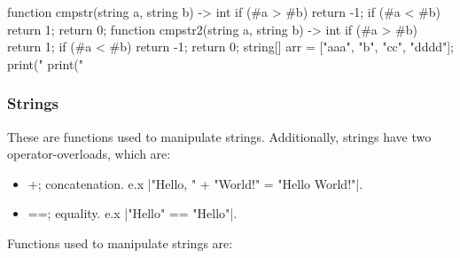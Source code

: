 \documentclass[12pt, letterpaper, oneside]{article}
\begin{document}
\begin{itemize}
		
		\begin{spverbatim}
			function cmpstr(string a, string b) -> int {
				if (#a > #b) {return -1;}
				if (#a < #b) {return 1;}
				return 0;
			}
			function cmpstr2(string a, string b) -> int {
				if (#a > #b) {return 1;}
				if (#a < #b) {return -1;}
				return 0;
			}
			string[] arr = ["aaa", "b", "cc", "dddd"];
			print("%
			print("%
		\end{spverbatim}
	\end{itemize}
	\subsubsection{Strings}
	These are functions used to manipulate strings. Additionally, strings have two operator-overloads, which are:
	\begin{itemize}
		\item[--] +; concatenation. e.x \spverb|"Hello, " + "World!" = "Hello World!"|.
		\item[--] ==; equality. e.x \spverb|"Hello" == "Hello"|.
	\end{itemize}
	Functions used to manipulate strings are:
\end{document}
